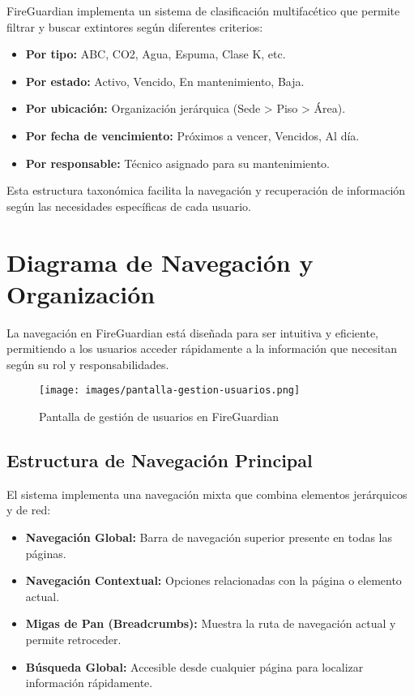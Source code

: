 \documentclass[11pt,a4paper]{article}
\begin{document}
FireGuardian implementa un sistema de clasificación multifacético que permite filtrar y buscar extintores según diferentes criterios:

\begin{itemize}
    \item \textbf{Por tipo:} ABC, CO2, Agua, Espuma, Clase K, etc.
    \item \textbf{Por estado:} Activo, Vencido, En mantenimiento, Baja.
    \item \textbf{Por ubicación:} Organización jerárquica (Sede > Piso > Área).
    \item \textbf{Por fecha de vencimiento:} Próximos a vencer, Vencidos, Al día.
    \item \textbf{Por responsable:} Técnico asignado para su mantenimiento.
\end{itemize}

Esta estructura taxonómica facilita la navegación y recuperación de información según las necesidades específicas de cada usuario.

\section{Diagrama de Navegación y Organización}

La navegación en FireGuardian está diseñada para ser intuitiva y eficiente, permitiendo a los usuarios acceder rápidamente a la información que necesitan según su rol y responsabilidades.

\begin{figure}[h]
    \centering
    \texttt{[image: images/pantalla-gestion-usuarios.png]}
    \caption{Pantalla de gestión de usuarios en FireGuardian}
    \label{fig:gestion-usuarios}
\end{figure}

\subsection{Estructura de Navegación Principal}

El sistema implementa una navegación mixta que combina elementos jerárquicos y de red:

\begin{itemize}
    \item \textbf{Navegación Global:} Barra de navegación superior presente en todas las páginas.
    \item \textbf{Navegación Contextual:} Opciones relacionadas con la página o elemento actual.
    \item \textbf{Migas de Pan (Breadcrumbs):} Muestra la ruta de navegación actual y permite retroceder.
    \item \textbf{Búsqueda Global:} Accesible desde cualquier página para localizar información rápidamente.
\end{itemize}
\end{document}
